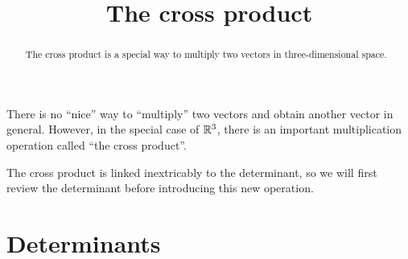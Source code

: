 \documentclass{ximera}
\title[Dig-In:]{The cross product}
\begin{document}
\begin{abstract}
  The cross product is a special way to multiply two vectors in
  three-dimensional space.
\end{abstract}
\maketitle

There is no ``nice'' way to ``multiply'' two vectors and obtain
another vector in general. However, in the special case of $\mathbb R^3$,
there is an important multiplication operation called ``the cross
product''.

The cross product is linked inextricably to the determinant, so we
will first review the determinant before introducing this new
operation.


\section{Determinants}
\end{document}
